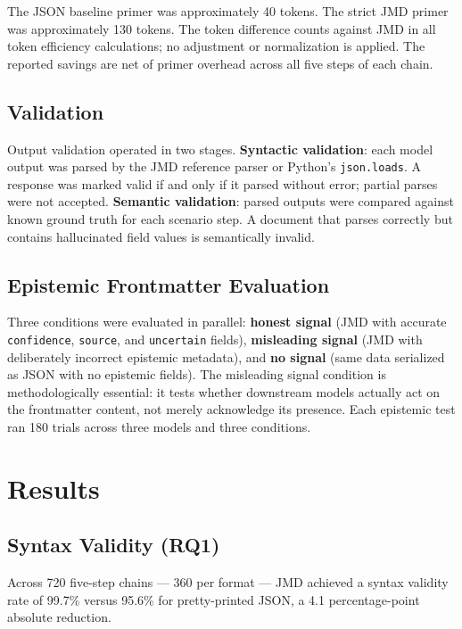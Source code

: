 \documentclass[11pt]{article}
\begin{document}
The JSON baseline primer was approximately 40 tokens. The strict JMD primer was approximately 130 tokens. The token difference counts against JMD in all token efficiency calculations; no adjustment or normalization is applied. The reported savings are net of primer overhead across all five steps of each chain.

\subsection{Validation}

Output validation operated in two stages. \textbf{Syntactic validation}: each model output was parsed by the JMD reference parser or Python's \texttt{json.loads}. A response was marked valid if and only if it parsed without error; partial parses were not accepted. \textbf{Semantic validation}: parsed outputs were compared against known ground truth for each scenario step. A document that parses correctly but contains hallucinated field values is semantically invalid.

\subsection{Epistemic Frontmatter Evaluation}

Three conditions were evaluated in parallel: \textbf{honest signal} (JMD with accurate \texttt{confidence}, \texttt{source}, and \texttt{uncertain} fields), \textbf{misleading signal} (JMD with deliberately incorrect epistemic metadata), and \textbf{no signal} (same data serialized as JSON with no epistemic fields). The misleading signal condition is methodologically essential: it tests whether downstream models actually act on the frontmatter content, not merely acknowledge its presence. Each epistemic test ran 180 trials across three models and three conditions.

\section{Results}
\label{sec:results}

\subsection{Syntax Validity (RQ1)}

Across 720 five-step chains --- 360 per format --- JMD achieved a syntax validity rate of 99.7\% versus 95.6\% for pretty-printed JSON, a 4.1 percentage-point absolute reduction.
\end{document}
